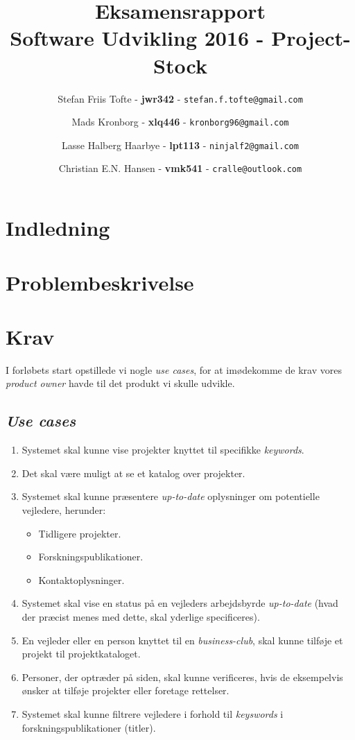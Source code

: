 \documentclass[12pt]{article}
\title{
  \vspace{3cm}
  \Huge{Eksamensrapport} \\
  \Large{Software Udvikling 2016 - Project-Stock}
}
\author{
	\Large{Stefan Friis Tofte} - \textbf{jwr342} - \texttt{stefan.f.tofte@gmail.com}
	\and
	\Large{Mads Kronborg} - \textbf{xlq446} - \texttt{kronborg96@gmail.com}
	\and
	\Large{Lasse Halberg Haarbye} - \textbf{lpt113} - \texttt{ninjalf2@gmail.com}
	\and
	\Large{Christian E.N. Hansen} - \textbf{vmk541} - \texttt{cralle@outlook.com}
}
\def \ColourPDF {../include/ku-farve}
\def \TitlePDF {../include/ku-en}  %
\begin{document}


\clearpage\maketitle
\thispagestyle{empty}

\newpage
\tableofcontents
\newpage

\section{Indledning}
\label{sec:indledning}

\section{Problembeskrivelse}
\label{sec:problem}

\section{Krav}
\label{sec:krav}
I forløbets start opstillede vi nogle \textit{use cases}, for at imødekomme de krav vores \textit{product owner} havde til det produkt vi skulle udvikle.

\subsection{\textit{Use cases}}
\begin{enumerate}
  \item Systemet skal kunne vise projekter knyttet til specifikke \textit{keywords}.
  \item Det skal være muligt at se et katalog over projekter.
  \item Systemet skal kunne præsentere \textit{up-to-date} oplysninger om potentielle vejledere, herunder:
  \begin{itemize}
    \item Tidligere projekter.
    \item Forskningspublikationer.
    \item Kontaktoplysninger.
  \end{itemize}
  \item Systemet skal vise en status på en vejleders arbejdsbyrde \textit{up-to-date} (hvad der præcist menes med dette, skal yderlige specificeres).
  \item En vejleder eller en person knyttet til en \textit{business-club}, skal kunne tilføje et projekt til projektkataloget.
  \item Personer, der optræder på siden, skal kunne verificeres, hvis de eksempelvis ønsker at tilføje projekter eller foretage rettelser.
	\item Systemet skal kunne filtrere vejledere i forhold til \textit{keyswords} i forskningspublikationer (titler).
\end{enumerate}
\end{document}
